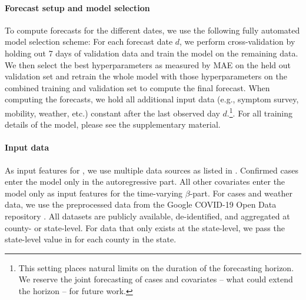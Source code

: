 \paragraph{Forecast setup and model selection} To compute forecasts for the
different dates, we use the following fully automated model
selection scheme: For each forecast date \(d\), we perform cross-validation by
holding out 7 days of validation data and train the model on the
remaining data. We then select the best hyperparameters as measured by MAE on
the held out validation set and retrain the whole model with those hyperparameters on the
combined training and validation set to compute the final forecast. When
computing the forecasts, we hold all additional input data (e.g., symptom
survey, mobility, weather, etc.) constant after the last observed day
\(d\).\footnote{This setting places natural limits on the duration of the forecasting
horizon. We reserve the joint forecasting of cases and covariates -- what could
extend the horizon -- for future work.}. For all training details of the model,
please see the supplementary material.


\paragraph{Input data} As input features for \bAR, we use multiple data sources
as listed in . Confirmed cases enter the model only in the
autoregressive part. All other covariates enter the model only as input features
for the time-varying \(\beta\)-part. For cases and weather data, we use the
preprocessed data from the Google COVID-19 Open Data repository
\citep{data/Wahltinez2020}. All datasets are publicly available, de-identified,
and aggregated at county- or state-level.  For data that only exists at the state-level,
we pass the state-level value in for each county in the state.

